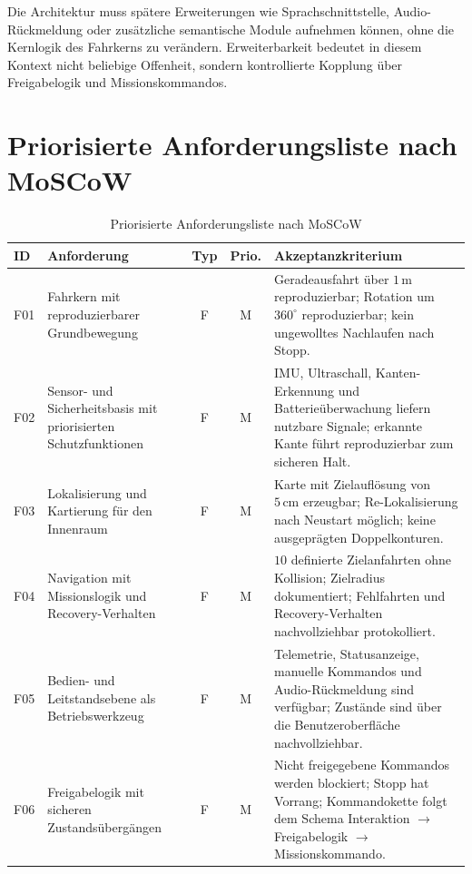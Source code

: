 Die Architektur muss spätere Erweiterungen wie Sprachschnittstelle, Audio-Rückmeldung oder zusätzliche semantische Module aufnehmen können, ohne die Kernlogik des Fahrkerns zu verändern. Erweiterbarkeit bedeutet in diesem Kontext nicht beliebige Offenheit, sondern kontrollierte Kopplung über Freigabelogik und Missionskommandos.

\section{Priorisierte Anforderungsliste nach MoSCoW}

\begin{table}[htbp]
  \centering
  \caption{Priorisierte Anforderungsliste nach MoSCoW}
  \small
  \begin{tabularx}{\textwidth}{l L c c L}
    \toprule
    \textbf{ID} & \textbf{Anforderung} & \textbf{Typ} & \textbf{Prio.} & \textbf{Akzeptanzkriterium} \\
    \midrule
    F01 & Fahrkern mit reproduzierbarer Grundbewegung & F & M & Geradeausfahrt über $1\,\mathrm{m}$ reproduzierbar; Rotation um $360^\circ$ reproduzierbar; kein ungewolltes Nachlaufen nach Stopp. \\
    \addlinespace
    F02 & Sensor- und Sicherheitsbasis mit priorisierten Schutzfunktionen & F & M & IMU, Ultraschall, Kanten-Erkennung und Batterieüberwachung liefern nutzbare Signale; erkannte Kante führt reproduzierbar zum sicheren Halt. \\
    \addlinespace
    F03 & Lokalisierung und Kartierung für den Innenraum & F & M & Karte mit Zielauflösung von $5\,\mathrm{cm}$ erzeugbar; Re-Lokalisierung nach Neustart möglich; keine ausgeprägten Doppelkonturen. \\
    \addlinespace
    F04 & Navigation mit Missionslogik und Recovery-Verhalten & F & M & $10$ definierte Zielanfahrten ohne Kollision; Zielradius dokumentiert; Fehlfahrten und Recovery-Verhalten nachvollziehbar protokolliert. \\
    \addlinespace
    F05 & Bedien- und Leitstandsebene als Betriebswerkzeug & F & M & Telemetrie, Statusanzeige, manuelle Kommandos und Audio-Rückmeldung sind verfügbar; Zustände sind über die Benutzeroberfläche nachvollziehbar. \\
    \addlinespace
    F06 & Freigabelogik mit sicheren Zustandsübergängen & F & M & Nicht freigegebene Kommandos werden blockiert; Stopp hat Vorrang; Kommandokette folgt dem Schema Interaktion $\rightarrow$ Freigabelogik $\rightarrow$ Missionskommando. \\

\end{tabularx}
\end{table}

